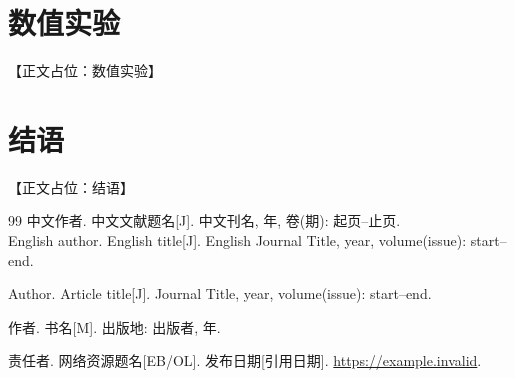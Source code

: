 \documentclass{setp-new}
\begin{document}
\section{数值实验}

【正文占位：数值实验】

\section{结语}

【正文占位：结语】

\begin{thebibliography}{99}
  中文作者. 中文文献题名[J]. 中文刊名, 年, 卷(期): 起页--止页.\\
  English author. English title[J]. English Journal Title, year, volume(issue): start--end.

  Author. Article title[J]. Journal Title, year, volume(issue): start--end.

  作者. 书名[M]. 出版地: 出版者, 年.

  责任者. 网络资源题名[EB/OL]. 发布日期[引用日期]. \url{https://example.invalid}.
\end{thebibliography}
\end{document}
